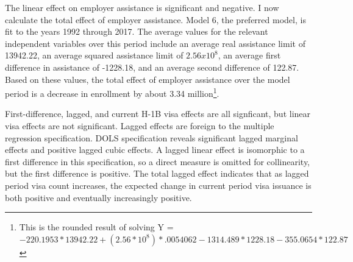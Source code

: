 \documentclass[review]{elsarticle}
\begin{document}
    The linear effect on employer assistance is significant and negative.
    I now calculate the total effect of employer assistance.
    Model 6, the preferred model, is fit to the years 1992 through 2017.
    The average values for the relevant independent variables over this period include
    an average real assistance limit of 13942.22,
    an average squared assistance limit of $2.56x10^8$,
    an average first difference in assistance of -1228.18,
    and an average second difference of 122.87.
    Based on these values, the total effect of employer assistance over the model period is
    a decrease in enrollment by about 3.34 million\footnote{
        This is the rounded result of solving Y = $-220.1953*13942.22+(2.56*10^8)*.0054062-1314.489*1228.18-355.0654*122.87$
    }.


    First-difference, lagged, and current H-1B visa effects are all signficant,
    but linear visa effects are not significant.
    Lagged effects are foreign to the multiple regression specification.
    DOLS specification reveals significant lagged marginal effects and positive
    lagged cubic effects.
    A lagged linear effect is isomorphic to a first difference in this specification,
    so a direct measure is omitted for collinearity,
    but the first difference is positive.
    The total lagged effect indicates that as lagged period visa count increases,
    the expected change in current period visa issuance is both positive and eventually increasingly positive.
\end{document}
